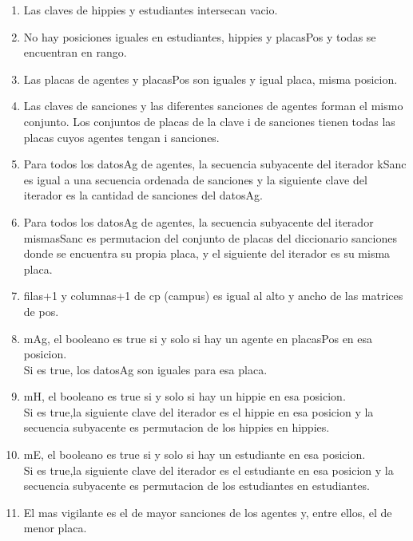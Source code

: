 \begin{Representacion}
	\begin{enumerate}
		\item Las claves de hippies y estudiantes intersecan vacio.
		\item No hay posiciones iguales en estudiantes, hippies y placasPos y todas se encuentran en rango.
		\item Las placas de agentes y placasPos son iguales y igual placa, misma posicion.
		\item Las claves de sanciones y las diferentes sanciones de agentes forman el mismo conjunto. Los conjuntos de placas de la clave i de sanciones tienen todas las placas cuyos agentes tengan i sanciones.
		\item Para todos los datosAg de agentes, la secuencia subyacente del iterador kSanc es igual a una secuencia ordenada de sanciones y la siguiente clave del iterador es la cantidad de sanciones del datosAg.
		\item Para todos los datosAg de agentes, la secuencia subyacente del iterador mismasSanc es permutacion del conjunto de placas del diccionario sanciones donde se encuentra su propia placa, y el siguiente del iterador es su misma placa.
		\item filas+1 y columnas+1 de cp (campus) es igual al alto y ancho de las matrices de pos.
		\item mAg, el booleano es true si y solo si hay un agente en placasPos en esa posicion.\\
		Si es true, los datosAg son iguales para esa placa.
		\item mH, el booleano es true si y solo si hay un hippie en esa posicion.\\
		Si es true,la siguiente clave del iterador es el hippie en esa posicion y la secuencia subyacente es permutacion de los hippies en hippies.
		\item mE, el booleano es true si y solo si hay un estudiante en esa posicion.\\
		Si es true,la siguiente clave del iterador es el estudiante en esa posicion y la secuencia subyacente es permutacion de los estudiantes en estudiantes.
		\item El mas vigilante es el de mayor sanciones de los agentes y, entre ellos, el de menor placa.
	\end{enumerate}
	

\end{Representacion}
